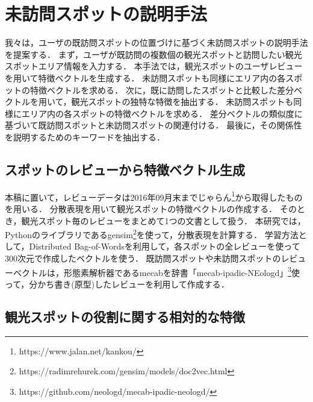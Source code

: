 \documentclass{deimj}
\begin{document}
\section{未訪問スポットの説明手法}
\label{sec:未訪問スポットの説明手法}
我々は，ユーザの既訪問スポットの位置づけに基づく未訪問スポットの説明手法を提案する．
まず，ユーザが既訪問の複数個の観光スポットと訪問したい観光スポットエリア情報を入力する．
本手法では，観光スポットのユーザレビューを用いて特徴ベクトルを生成する．
未訪問スポットも同様にエリア内の各スポットの特徴ベクトルを求める．
次に，既に訪問したスポットと比較した差分ベクトルを用いて，観光スポットの独特な特徴を抽出する．
未訪問スポットも同様にエリア内の各スポットの特徴ベクトルを求める．
差分ベクトルの類似度に基づいて既訪問スポットと未訪問スポットの関連付ける．
最後に，その関係性を説明するためのキーワードを抽出する．

\subsection{スポットのレビューから特徴ベクトル生成}
\label{subsec:スポットのレビューから特徴ベクトル生成}
本稿に置いて，レビューデータは2016年09月末までじゃらん\footnote{https://www.jalan.net/kankou/}から取得したものを用いる．
分散表現\cite{Codd10}を用いて観光スポットの特徴ベクトルの作成する．
そのとき，観光スポット毎のレビューをまとめて1つの文書として扱う．
本研究では，Pythonのライブラリであるgensim\footnote{https://radimrehurek.com/gensim/models/doc2vec.html}を使って，分散表現を計算する．
学習方法として，Distributed Bag-of-Wordsを利用して，各スポットの全レビューを使って300次元で作成したベクトルを使う．
既訪問スポットや未訪問スポットのレビューベクトルは，形態素解析器であるmecab\cite{Codd10}を辞書「mecab-ipadic-NEologd」\footnote{https://github.com/neologd/mecab-ipadic-neologd/}使って，分かち書き(原型)したレビューを利用して作成する．

\subsection{観光スポットの役割に関する相対的な特徴}
\label{subsec:観光スポットの役割に関する相対的な特徴}
\end{document}
